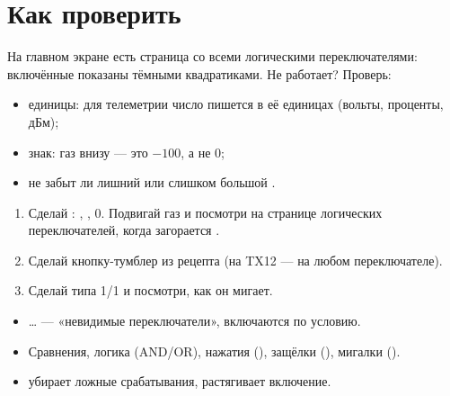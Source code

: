 \section{Как проверить}

На главном экране есть страница со всеми логическими переключателями: включённые показаны
тёмными квадратиками. Не работает? Проверь:
\begin{itemize}
  \item единицы: для телеметрии число пишется в её единицах (вольты, проценты, дБм);
  \item знак: газ внизу --- это $-100$, а не 0;
  \item не забыт ли лишний  или слишком большой .
\end{itemize}

\begin{tryit}
\begin{enumerate}
  \item Сделай : , , 0. Подвигай газ и посмотри на странице
        логических переключателей, когда загорается .
  \item Сделай кнопку-тумблер из рецепта (на TX12 --- на любом переключателе).
  \item Сделай  типа  1/1 и посмотри, как он мигает.
\end{enumerate}
\end{tryit}

\begin{summary}
\begin{itemize}
  \item {}… --- «невидимые переключатели», включаются по условию.
  \item Сравнения, логика (AND/OR), нажатия (), защёлки (), мигалки ().
  \item {} убирает ложные срабатывания,  растягивает включение.
\end{itemize}
\end{summary}
